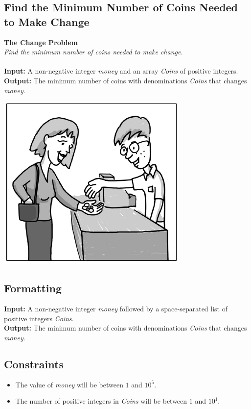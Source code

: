 \documentclass{article}
\begin{document}
\subsection{Find the Minimum Number of Coins Needed to Make Change}
\hline\vspace{5}
\textbf{The Change Problem}\\
\emph{Find the minimum number of coins needed to make change}.\\ \\
\textbf{Input:} A non-negative integer \emph{money} and an array \emph{Coins} of positive integers.\\
\textbf{Output:} The minimum number of coins with denominations \emph{Coins} that changes \emph{money}.
\begin{center}
    \includegraphics[scale=0.6]{c5/logos/5A.png}
\end{center}
\hline\vspace{5}

\subsection*{Formatting}
\noindent\textbf{Input:} A non-negative integer \emph{money} followed by a space-separated list of positive integers \emph{Coins}.\\
\noindent\textbf{Output:} The minimum number of coins with denominations \emph{Coins} that changes \emph{money}.

\subsection*{Constraints}
\begin{itemize}
    \item The value of \emph{money} will be between $1$ and $10^5$.
    \item The number of positive integers in \emph{Coins} will be between $1$ and $10^1$.
\end{itemize}
\pagebreak
\end{document}
